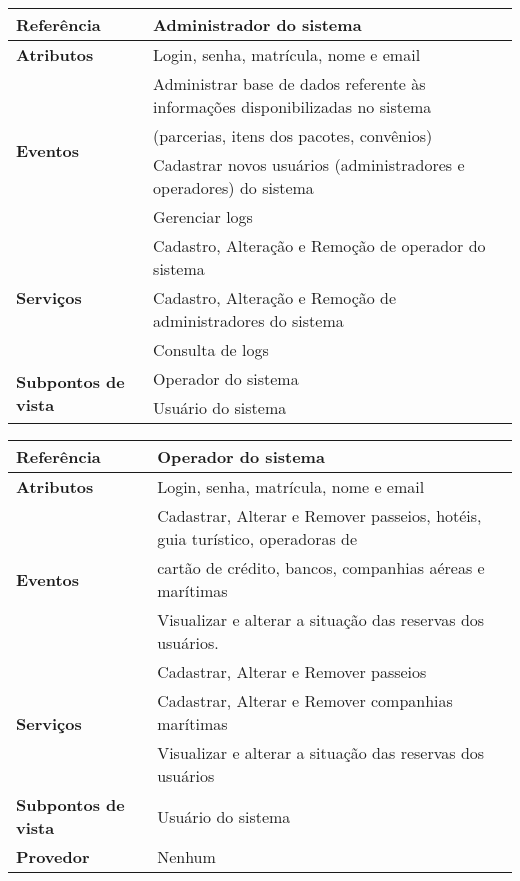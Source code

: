 \documentclass[12pt,twoside,a4paper]{article}
\begin{document}
\begin{table}[H]
\label{tab:VORD01}
\begin{small}
\begin{center}
    \begin{tabular}{ | l | l |}
    \hline
\textbf{Referência} & {Administrador do sistema}\\ \hline
\textbf{Atributos} & Login, senha, matrícula, nome e email \\\hline
\multirow{4}{*}{\textbf{Eventos}} & Administrar base de dados referente às informações disponibilizadas no sistema \\ & (parcerias, itens dos pacotes, convênios) \\ & Cadastrar novos usuários (administradores e operadores) do sistema \\ & Gerenciar logs\\\hline
\multirow{3}{*}{\textbf{Serviços}} & Cadastro, Alteração e Remoção de operador do sistema\\ & Cadastro, Alteração e Remoção de administradores do sistema\\& Consulta de logs\\\hline
\multirow{2}{*}{\textbf{Subpontos de vista}} & Operador do sistema \\ &
Usuário do sistema \\\hline
    \end{tabular}
\end{center}    
\end{small}
\end{table}

\begin{table}[H]
\label{tab:VORD02}
\begin{small}
\begin{center}
    \begin{tabular}{ | l | l |}
    \hline
\textbf{Referência} & {Operador do sistema}\\ \hline
\textbf{Atributos} & Login, senha, matrícula, nome e email \\\hline
\multirow{3}{*}{\textbf{Eventos}} & Cadastrar, Alterar e Remover passeios, hotéis, guia turístico, operadoras de \\& cartão de crédito, bancos, companhias aéreas e marítimas\\ & Visualizar e alterar a situação das reservas dos usuários. \\\hline
\multirow{3}{*}{\textbf{Serviços}} & Cadastrar, Alterar e Remover passeios\\ & Cadastrar, Alterar e Remover companhias marítimas \\& Visualizar e alterar a situação das reservas dos usuários\\\hline
\textbf{Subpontos de vista} & Usuário do sistema\\\hline
\textbf{Provedor} & Nenhum\\\hline
    \end{tabular}
\end{center}    
\end{small}
\end{table}
\end{document}
